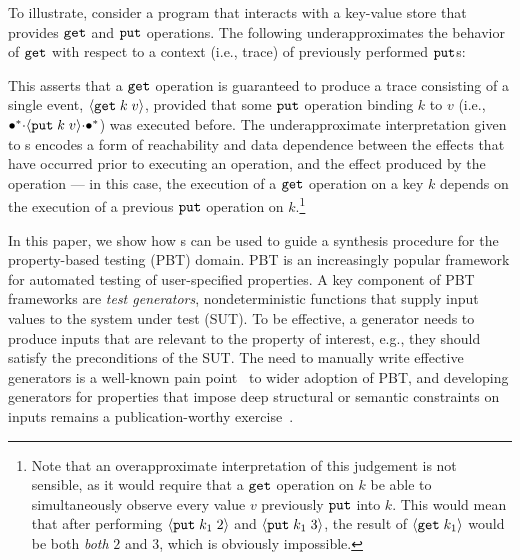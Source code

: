 To illustrate, consider a program that interacts with a key-value
store that provides $\boldsymbol{{\tt get}}$ and $\boldsymbol{{\tt put}}$ operations. The
following \tyName{} underapproximates the behavior of $\boldsymbol{{\tt get}}$ with
respect to a context (i.e., trace) of previously performed
$\boldsymbol{{\tt put}}$s:
\vspace{-.4cm} \par{}\noindent
This \tyName{} asserts that a $\boldsymbol{{\tt get}}$ operation is guaranteed to
produce a trace consisting of a single event, ${\langle} {\boldsymbol{{\tt get}}\;{k\; v}} {\rangle}$,
provided that some $\boldsymbol{{\tt put}}$ operation binding $k$ to $v$
(i.e., ${\bullet^*}{\cdot}{\langle} {\boldsymbol{{\tt put}}\;{k\;v}} {\rangle}{\cdot}{\bullet^*}$) was executed before.  The
underapproximate interpretation given to \tyName{}s encodes a form of
reachability and data dependence between the effects that have
occurred prior to executing an operation, and the effect produced by
the operation --- in this case, the execution of a $\boldsymbol{{\tt get}}$
operation on a key $k$ depends on the execution of a previous
$\boldsymbol{{\tt put}}$ operation on $k$.\footnote{Note that an overapproximate
  interpretation of this judgement is not sensible, as it would
  require that a $\boldsymbol{{\tt get}}$ operation on $k$ be able to
  simultaneously observe every value $v$ previously $\boldsymbol{{\tt put}}$ into
  $k$. This would mean that after performing ${\langle} {\boldsymbol{{\tt put}}\;{k_1\;2}} {\rangle}$ and
  ${\langle} {\boldsymbol{{\tt put}}\;{k_1\;3}} {\rangle}$, the result of ${\langle} {\boldsymbol{{\tt get}}\;{k_1}} {\rangle}$ would be both
  \emph{both} $2$ and $3$, which is obviously impossible.}

In this paper, we show how \tyName{}s can be used to guide a synthesis
procedure for the property-based testing (PBT) domain. PBT is an
increasingly popular framework for automated testing of user-specified
properties. A key component of PBT frameworks are \emph{test
  generators}, nondeterministic functions that supply input values to
the system under test (SUT). To be effective, a generator needs to
produce inputs that are relevant to the property of interest, e.g.,
they should satisfy the preconditions of the SUT.  The need to
manually write effective generators is a well-known pain
point~\cite{HC+24} to wider adoption of PBT, and developing generators
for properties that impose deep structural or semantic constraints on
inputs remains a publication-worthy exercise~\cite{pbt-ifc, PCRH+11,
  FQL24}.

